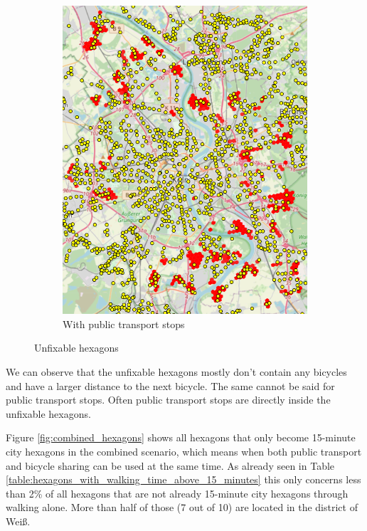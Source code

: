 \begin{figure}
\begin{subfigure}[b]{0.30\textwidth}
         \includegraphics[width=\textwidth]{Figures/results/problematic_hexagons/unfixable_with_stops.png}
         \caption{With public transport stops}
         \label{fig:unfixable_with_stops}
     \end{subfigure}
     \hfill
     \caption{Unfixable hexagons}
     \label{fig:unfixable_hexagons}
\end{figure}

We can observe that the unfixable hexagons mostly don't contain any bicycles and have a larger distance to the next bicycle.
The same cannot be said for public transport stops.
Often public transport stops are directly inside the unfixable hexagons.


Figure \ref{fig:combined_hexagons} shows all hexagons that only become 15-minute city hexagons in the combined scenario, which means when both public transport and bicycle sharing can be used at the same time.
As already seen in Table \ref{table:hexagons_with_walking_time_above_15_minutes} this only concerns less than 2\% of all hexagons that are not already 15-minute city hexagons through walking alone.
More than half of those (7 out of 10) are located in the district of Weiß.


